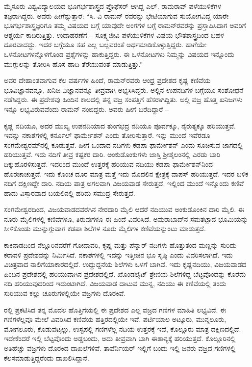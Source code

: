ಮೈಸೂರು ವಿಶ್ವವಿದ್ಯಾಲಯದ ಭೂಗರ್ಭಶಾಸ್ತ್ರದ ಪ್ರೊಫೆಸರ್‍ ಆಗಿದ್ದ ಎಲ್‍. ರಾಮರಾವ್‍ ಪಳೆಯುಳಿಕೆಗಳ ತಜ್ಞರಾಗಿದ್ದರು. ಅವರು ಹೀಗೆನ್ನುತ್ತಾರೆ: “ಸಿ. ವಿ ರಾಮನ್‍ ರವರನ್ನು ಭೇಟಿಯಾಗುವ ಸುಯೋಗವಿದ್ದ ಯಾರೇ ಭೂಗರ್ಭಶಾಸ್ತ್ರಜ್ಞರಿಗೂ ತಮ್ಮ ವಿಷಯದ ಬಗ್ಗೆ ಯಾವುದೇ ಅಂಗಗಳ ಬಗ್ಗೆ ರಾಮನ್‍ರವರನ್ನು ಪ್ರಸ್ತಾಪಿಸಿದಾಗ ಅವರಿಗೆ ಆಶ್ಚರ್ಯ ಕಾದಿರುತ್ತಿತ್ತು. ಉದಾಹರಣೆಗೆ – ಸೂಕ್ಷ್ಮಜೀವಿ ಪಳೆಯುಳಿಕೆಗಳ ವಿಷಯ ಭೌತಶಾಸ್ತ್ರದಿಂದ ಬಹಳ ದೂರವಾದದ್ದು. ಇದರ ಬಗ್ಗೆಯೂ ಸಹ ಎಲ್ಲ ಬಲ್ಲವರಂತೆ ಅರ್ಥಮಾಡಿಕೊಳ್ಳುತ್ತಿದ್ದರು. ಹಾಗೆಯೇ ಒಳನೋಟಗಳನ್ನೊಳಗೊಂಡ ಪ್ರಶ್ನೆಗಳನ್ನು ಹಾಕುತ್ತಿದ್ದರು. ಈ ಒಳನೋಟಗಳು ನಿಮ್ಮನ್ನು ವಿಷಯದ ಇನ್ನೊಂದು ಮುಗ್ಗುಲನ್ನು ತೋರಿಸಿ ಹೊಸ ಹಾದಿ ತೆರೆಯುವಂತೆ ಮಾಡುತ್ತಿತ್ತು.”

ಅವರ ದೇಹಾಂತವಾಗುವ ಕೆಲ ವರ್ಷಗಳ ಹಿಂದೆ, ರಾಮನ್‌ರವರು ಆಂಧ್ರ ಪ್ರದೇಶದ ಕೃಷ್ಣ ಕಣಿವೆಯ ಭೂವಿಜ್ಞಾನವನ್ನೂ, ಖನಿಜ ವಿಜ್ಞಾನವನ್ನೂ ತೀವ್ರವಾಗಿ ಅಭ್ಯಸಿಸಿದ್ದರು. ಅಲ್ಲಿನ ಉಪನದಿಗಳ ಬಗ್ಗೆಯೂ ಸಂಶೋಧನೆ ನಡೆಸಿದ್ದರು. ಈ ಪ್ರದೇಶವು ಹಿಂದಿನ ಕಾಲದಲ್ಲಿ ತನ್ನ ವಜ್ರ ಸಂಪತ್ತಿಗೆ ಹೆಸರಾಗಿದ್ದಿತು. ಅಲ್ಲಿ ವಜ್ರ ಹೊತ್ತ ಖನಿಜಗಳು ಇನ್ನೂ ಲಭ್ಯವಿರುವವೆಂದು ರಾಮನ್ ನಂಬಿದ್ದರು. ಅವರು ಹೀಗೆ ಬರೆದಿದ್ದಾರೆ –

ಕೃಷ್ಣ ನದಿಯೂ, ಅದರ ಮುಖ್ಯ ಉಪನದಿಯಾದ ತುಂಗಭದ್ರ ನದಿಯೂ ಪೂರ್ವಕ್ಕೂ, ನೈರುತ್ಯಕ್ಕೂ  ಹರಿಯುತ್ತವೆ. ಇವನ್ನು ನಕಾಶೆಗಳಲ್ಲಿ ಕರ್ನೂಲ್ ಫಾರ್ಮೇಶನ್ ಎಂದು ತೋರಿಸುತ್ತಾರೆ. ಇನ್ನು ಮುಂದೆ ಇವೆರಡೂ ಸಂಗಮೇಶ್ವರಮ್‍ನಲ್ಲಿ ಕೂಡುತ್ತವೆ. ಹೀಗೆ ಒಂದಾದ ನದಿಗಳು ಕಡಪಾ ಫಾರ್ಮೇಶನ್ ಎಂದು ಸೂಚಿಸುವ ಜಾಗದಲ್ಲಿ ಹರಿಯುತ್ತವೆ. ಇದು ನದಿಗೆ ತೀವ್ರ ಕಷ್ಟಕರ ದಾರಿ. ಅಂಕುಡೊಂಕುಗಳು ಜಾಸ್ತಿ ಶ‍್ರೀಶೈಲಂನಲ್ಲಿ ಎರಡು ಬಾರಿ ದಿಕ್ಕುಹೊರಳಿಸುತ್ತದೆ. ಇದರಿಂದ ಮುಂದೆ ಉತ್ತರಕ್ಕೆ ಹರಿಯುವ ನದಿಯು ಕಡಪಾ ಫಾರ್ಮೇಶನ್‌ನಿಂದ ಹೊರಚಾಚುತ್ತದೆ. ಇದು ಕೊಂಚ ದೂರ ಮಾತ್ರ ಮತ್ತೆ ಇದು ಮೊದಲಿನ ಕ್ಷೇತ್ರಕ್ಕೆ ವಾಪಸ್ ಹರಿಯುತ್ತದೆ. ಇದರ ಬಳಿಕ ನದಿಗೆ ದಕ್ಷಿಣದ್ದೇ ದಾರಿ. ನದಿಯ ಪಾತ್ರ ಅಗಲವಾಗಿ ವಿಜಯವಾಡ ಸೇರುತ್ತದೆ. ಇಲ್ಲಿಂದ ಮುಂದೆ ಇನ್ನೊಂದು ಕಣಿವೆ ಹಾದು ವಿಸ್ತಾರವಾದ ಬಯಲಿನಲ್ಲಿ ಹರಿದು ಸಮುದ್ರ ಸೇರುತ್ತದೆ.

ಸಂಗಮೇಶ್ವರದಿಂದ, ವಿಜಯವಾಡದವರೆಗಿನ ನೇರದಾರಿ  ಮೈಲಿ ಆದರೆ ನದಿಯುವ ಅಂಕುಡೊಂಕಿನ ದಾರಿ  ಮೈಲಿ. ಈ ನೂರು ಮೈಲಿಗಳಲ್ಲಿ ಕಣಿವೆಗಳೂ, ತಿರುವುಗಳೂ ಈ ಹಿಂದೆ ವಿವರಿಸಿದೆ. ಅಮರಾಬಾದ್‌ನ ಸಮತಟ್ಟಾದ ಭೂಮಿಯನ್ನು ಸೀಳಿಕೊಂಡು ಮುನ್ನುಗ್ಗುವಾಗ ಕಡಪಾ ಶಿಲೆಗಳ ನೂರು ಮೈಲಿಗಳ ಕಣಿವೆಯನ್ನುಂಟು ಮಾಡುತ್ತದೆ.

ಕಾಕಿನಾಡದಿಂದ ನೆಲ್ಲೂರಿನವರೆಗೆ ಗೋದಾವರಿ, ಕೃಷ್ಣ ಮತ್ತು ಪೆನ್ನಾರ್ ನದಿಗಳು ಹೊತ್ತುತಂದ ಮಣ್ಣನ್ನು ಸುರಿದು ಕರಾವಳಿ ಪ್ರದೇಶವನ್ನು ನಿರ್ಮಿಸಿದೆ. ನಕಾಶೆಗಳಲ್ಲಿ ಇದನ್ನು ಇತ್ತೀಚಿನ ಭೂ ಸೃಷ್ಠಿ ಎಂದು ವಿವರಿಸಲಾಗಿದೆ. ಇದು ವಿಚಿತ್ರವಾದ ನಾಲಿಗೆಯಾಕಾರದಲ್ಲಿದೆ. ಉದ್ದುದ್ದನೆಯ ಶಿಲೆಗಳು ಒಳಗೆ ಬಾಗಿವೆ. ಇದು ಕೃಷ್ಣನದಿಯು, ವಿಜಯವಾಡದ ಹಿಂದಿನ ಪ್ರದೇಶದಲ್ಲಿ ಹರಿಯುವಾಗಿನ ಪ್ರದೇಶದಲ್ಲಿದೆ. ಖೊಂಡಲೈಟ್ ಶ್ರೇಣಿಯ ಶಿಲೆಗಳಿದ್ದ ಬೆಟ್ಟವೊಂದನ್ನು ಕೊರೆದು ನದಿ ಹರಿಯುವುದರಿಂದ ಇದುಂಟಾಗಿದೆ. ವಿಜಯವಾಡ ದಾಟುವ ಮುನ್ನ, ನದಿಯು ಈ ಕಣಿವೆಯಲ್ಲಿ ತಂದು ಸುರಿಯುವ ಕಲ್ಲು ಚೂರುಗಳಲ್ಲಿಯೇ ವಜ್ರಗಳು ದೊರಕಿವೆ.

 ರಲ್ಲಿ  ಪ್ರಕಟಿಸಿದ ತನ್ನ ಮೊದಲ ಹೊತ್ತಿಗೆಯಲ್ಲಿ ಈ ಪ್ರದೇಶದ ಎಲ್ಲ ವಜ್ರದ ಗಣಿಗಳ ಮಾಹಿತಿ ಲಭ್ಯವಿದೆ. ಈ ಗಣಿಗಳೆಲ್ಲವೂ ಮೇಲೆ ವಿವರಿಸಿದ ಕಣಿವೆಯ ಹತ್ತಿರದಲ್ಲಿಯೇ ಇವೆ. ಪರ್ಟಿಯಾಲ ಅಟ್ಕೂರು, ಮುನ್ನಲೂರು, ಮೋಗಲೂರು, ಕೊಡುವಟ್ಕಲ್ಲು, ಉಸ್ಟಪಲ್ಲಿ ಗಣಿಗಳೆಲ್ಲ ನದಿಯ ಉತ್ತರಕ್ಕೆ ಇವೆ, ಕೊಲ್ಲೂರು ಮಾತ್ರ ದಕ್ಷಿಣದಲ್ಲಿದೆ. ಇದೇಕೆಂದರೆ ಇಲ್ಲಿ ಬೆಟ್ಟವೊಂದು ಅಡ್ಡಬಂದು, ಅದು ತೀವ್ರವಾಗಿ ಬಾಗಿ ಈಶಾನ್ಯಕ್ಕೆ ಹರಿಯುತ್ತದೆ. ಕೊಲ್ಲೂರಿನಲ್ಲಿ ಅತಿಹೆಚ್ಚು ವಜ್ರಗಳು ದೊರಕಿದ ದಾಖಲೆಗಳಿವೆ. ತಾವೆರ್ನಿಯರ್ ಇಲ್ಲಿಗೆ ಬಂದು ಇಲ್ಲಿ  ಜನರು ವಜ್ರದ ಗಣಿಗಳಲ್ಲಿ ಕೆಲಸಮಾಡುತ್ತಿದ್ದರೆಂದು ದಾಖಲಿಸಿದ್ದಾನೆ.

